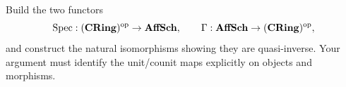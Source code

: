 \begin{problem}\label{chal:vi19-c01}
Build the two functors
\[
\operatorname{Spec}:(\mathbf{CRing})^{\mathrm{op}}\to\mathbf{AffSch},
\qquad
\Gamma:\mathbf{AffSch}\to(\mathbf{CRing})^{\mathrm{op}},
\]
and construct the natural isomorphisms showing they are quasi-inverse.  Your argument must identify the unit/counit maps explicitly on objects and morphisms.
\end{problem}

